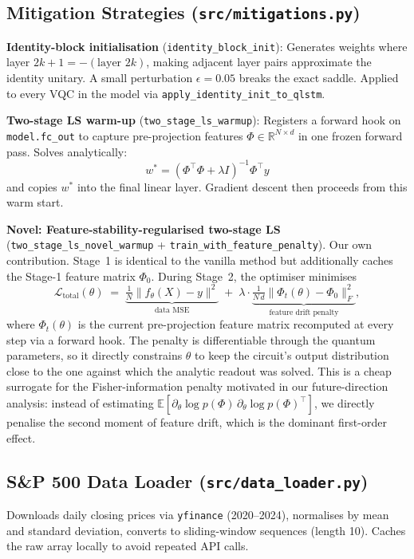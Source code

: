 \documentclass[11pt,a4paper]{article}
\begin{document}
\subsection{Mitigation Strategies (\texttt{src/mitigations.py})}

\textbf{Identity-block initialisation} (\texttt{identity\_block\_init}): Generates weights where layer $2k{+}1 = -(\text{layer } 2k)$, making adjacent layer pairs approximate the identity unitary. A small perturbation $\epsilon{=}0.05$ breaks the exact saddle. Applied to every VQC in the model via \texttt{apply\_identity\_init\_to\_qlstm}.

\textbf{Two-stage LS warm-up} (\texttt{two\_stage\_ls\_warmup}): Registers a forward hook on \texttt{model.fc\_out} to capture pre-projection features $\Phi \in \mathbb{R}^{N \times d}$ in one frozen forward pass. Solves analytically:
\[
  w^* = (\Phi^\top \Phi + \lambda I)^{-1} \Phi^\top y
\]
and copies $w^*$ into the final linear layer. Gradient descent then proceeds from this warm start.

\textbf{Novel: Feature-stability-regularised two-stage LS} (\texttt{two\_stage\_ls\_novel\_warmup} + \texttt{train\_with\_feature\_penalty}). Our own contribution. Stage~1 is identical to the vanilla method but additionally caches the Stage-1 feature matrix $\Phi_0$. During Stage~2, the optimiser minimises
\[
  \mathcal{L}_{\text{total}}(\theta) \;=\; \underbrace{\tfrac{1}{N}\|f_\theta(X) - y\|^2}_{\text{data MSE}} \;+\; \lambda \cdot \underbrace{\tfrac{1}{N\,d}\|\Phi_t(\theta) - \Phi_0\|_F^2}_{\text{feature drift penalty}},
\]
where $\Phi_t(\theta)$ is the current pre-projection feature matrix recomputed at every step via a forward hook. The penalty is differentiable through the quantum parameters, so it directly constrains $\theta$ to keep the circuit's output distribution close to the one against which the analytic readout was solved. This is a cheap surrogate for the Fisher-information penalty motivated in our future-direction analysis: instead of estimating $\mathbb{E}[\partial_\theta \log p(\Phi)\,\partial_\theta \log p(\Phi)^\top]$, we directly penalise the second moment of feature drift, which is the dominant first-order effect.

\subsection{S\&P 500 Data Loader (\texttt{src/data\_loader.py})}

Downloads daily closing prices via \texttt{yfinance} (2020--2024), normalises by mean and standard deviation, converts to sliding-window sequences (length 10). Caches the raw array locally to avoid repeated API calls.
\end{document}
